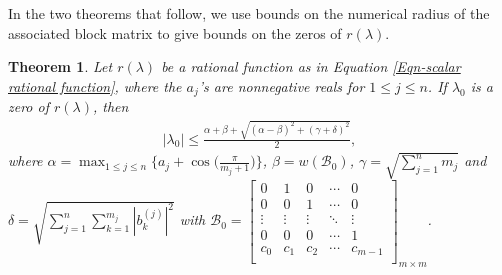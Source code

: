 \documentclass[12pt, reqno]{amsart}
\newtheorem{theorem}{Theorem}[section]
\theoremstyle{definition}
\theoremstyle{remark}
\numberwithin{equation}{section}
\begin{document}
In the two theorems that follow, we use bounds on the numerical radius of the associated block matrix to 
give bounds on the zeros of $r(\lambda)$.

\begin{theorem}\label{Thm-bounds on zeros using numerical range-2}
Let $r(\lambda)$ be a rational function as in Equation \eqref{Eqn-scalar rational function}, 
where the $a_j$'s are nonnegative reals for $1 \leq j \leq n$. 
If $\lambda_0$ is a zero of $r(\lambda)$, then 
\begin{align*}
|\lambda_0| \leq \displaystyle \frac{\alpha+ \beta +\sqrt{(\alpha-\beta)^2 + (\gamma+\delta)^2}}{2},
\end{align*}
where $\alpha = \displaystyle \max_{1 \leq j \leq n} \Big\{a_j + 
\cos\Big(\frac{\pi}{m_j+1}\Big) \Big\}$, $\beta = w(\mathcal{B}_0)$, $\gamma = 
\displaystyle \sqrt{\sum_{j=1}^{n} m_j}$ and $\delta = \displaystyle 
\sqrt{ \sum_{j=1}^{n}\sum_{k=1}^{m_j} {|b_{k}^{(j)}|}^2}$ with $\mathcal{B}_0 = 
\begin{bmatrix}
0 & 1 & 0 & \cdots & 0\\
0 & 0 & 1 & \cdots & 0\\
\vdots & \vdots & \vdots & \ddots & \vdots\\
0 & 0 & 0 & \cdots & 1\\
c_0 & c_1 & c_2 & \cdots & c_{m-1}\\ 
\end{bmatrix}_{m \times m}$.
\end{theorem}
\end{document}
